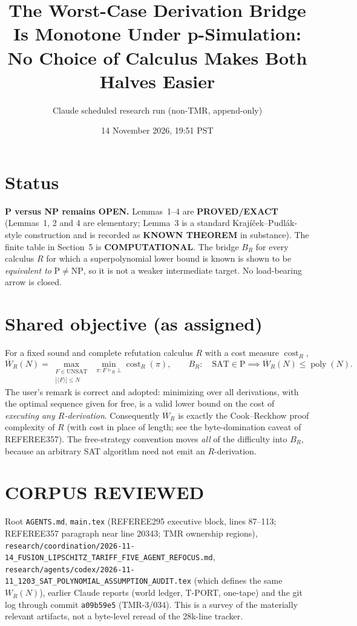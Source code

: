 \documentclass[11pt]{article}
\title{The Worst-Case Derivation Bridge Is Monotone Under p-Simulation:\\
No Choice of Calculus Makes Both Halves Easier}
\author{Claude scheduled research run (non-TMR, append-only)}
\date{14 November 2026, 19:51 PST}
\newcommand{\poly}{\operatorname{poly}}
\newcommand{\SAT}{\mathrm{SAT}}
\newcommand{\Wb}{\overline W}
\begin{document}
\maketitle

\section*{Status}
\textbf{P versus NP remains OPEN.} Lemmas~1--4 are \textbf{PROVED/EXACT}
(Lemmas~1, 2 and 4 are elementary; Lemma~3 is a standard Krajíček--Pudlák-style
construction and is recorded as \textbf{KNOWN THEOREM} in substance). The
finite table in Section~5 is \textbf{COMPUTATIONAL}. The bridge
$B_R$ for every calculus $R$ for which a superpolynomial lower bound is known
is shown to be \emph{equivalent to} $\mathrm P\neq\mathrm{NP}$, so it is not a
weaker intermediate target. No load-bearing arrow is closed.

\section*{Shared objective (as assigned)}
For a fixed sound and complete refutation calculus $R$ with a cost measure
$\operatorname{cost}_R$,
\[
\Wb_R(N)=\max_{\substack{F\in\mathrm{UNSAT}\\|\langle F\rangle|\le N}}
\ \min_{\pi:F\vdash_R\bot}\operatorname{cost}_R(\pi),
\qquad
B_R:\quad \SAT\in\mathrm P\implies \Wb_R(N)\le\poly(N).
\]
The user's remark is correct and adopted: minimizing over all derivations,
with the optimal sequence given for free, is a valid lower bound on the cost of
\emph{executing any $R$-derivation}. Consequently $\Wb_R$ is exactly the
Cook--Reckhow proof complexity of $R$ (with cost in place of length; see the
byte-domination caveat of REFEREE357). The free-strategy convention moves
\emph{all} of the difficulty into $B_R$, because an arbitrary SAT algorithm
need not emit an $R$-derivation.

\section*{CORPUS REVIEWED}
Root \texttt{AGENTS.md}, \texttt{main.tex} (REFEREE295 executive block, lines
87--113; REFEREE357 paragraph near line 20343; TMR ownership regions),
\texttt{research/coordination/2026-11-14\_FUSION\_LIPSCHITZ\_TARIFF\_FIVE\_AGENT\_REFOCUS.md},
\texttt{research/agents/codex/2026-11-11\_1203\_SAT\_POLYNOMIAL\_ASSUMPTION\_AUDIT.tex}
(which defines the same $W_R(N)$), earlier Claude reports (world ledger,
T-PORT, one-tape) and the git log through commit \texttt{a09b59e5}
(TMR-3/034). This is a survey of the materially relevant artifacts, not a
byte-level reread of the 28k-line tracker.
\end{document}

